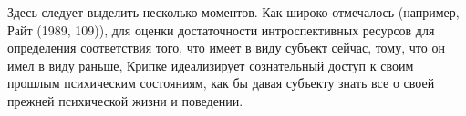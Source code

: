 \documentclass{book}
\begin{document}
Здесь следует выделить несколько моментов. Как широко отмечалось (например, Райт (1989, 109)), для оценки достаточности интроспективных ресурсов для определения соответствия того, что имеет в виду субъект сейчас, тому, что он имел в виду раньше, Крипке идеализирует сознательный доступ к своим прошлым психическим состояниям, как бы давая субъекту знать все о своей прежней психической жизни и поведении.
\end{document}
